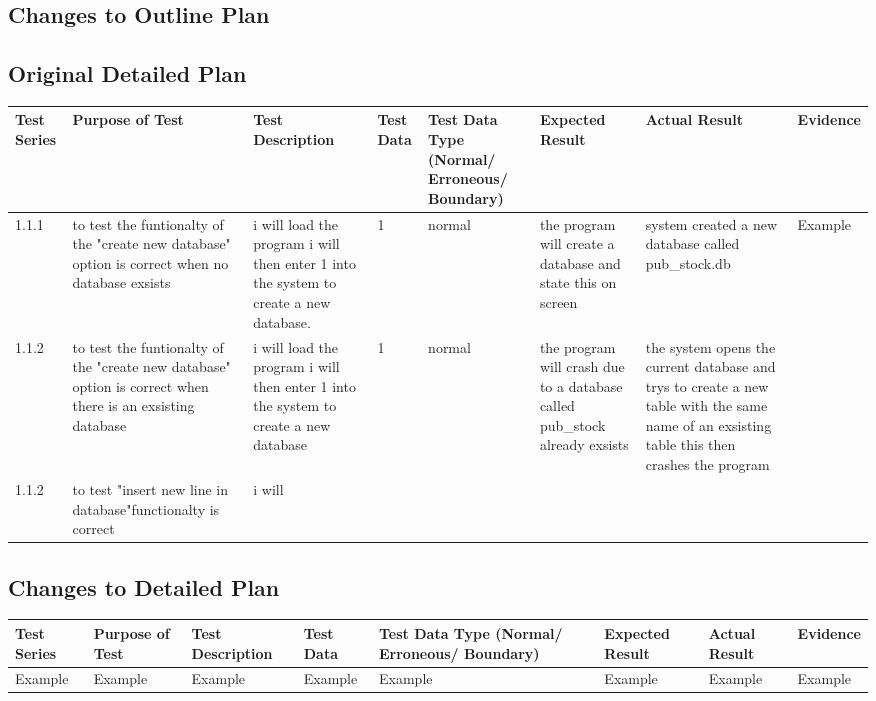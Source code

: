 \begin{landscape}
\subsection{Changes to Outline Plan}

\subsection{Original Detailed Plan}

\begin{center}
    \begin{longtable}{|p{1.5cm}|p{2.5cm}|p{2.5cm}|p{2cm}|p{2cm}|p{2cm}|p{2cm}|p{2cm}|}
        \hline
        \textbf{Test Series} & \textbf{Purpose of Test} & \textbf{Test Description} & \textbf{Test Data} & \textbf{Test Data Type (Normal/ Erroneous/ Boundary)} & \textbf{Expected Result} & \textbf{Actual Result} & \textbf{Evidence}\\ \hline
       1.1.1 & to test the funtionalty of the "create new database" option is correct when no database exsists & i will load the program i will then enter 1 into the system to create a new database. & 1 & normal & the program will create a database and state this on screen &system created a new database called pub_stock.db & Example \\ \hline
1.1.2 & to test the funtionalty of the "create new database" option is correct when there is an exsisting database  &  i will load the program i will then enter 1 into the system to create a new database & 1 & normal &the program will crash due to a database called pub_stock already exsists & the system opens the current database and trys to create a new table with the same name of an exsisting table this then crashes the program & \\ \hline
1.1.2 & to test "insert new line in database"functionalty is correct & i will

    \end{longtable}
\end{center}

\subsection{Changes to Detailed Plan}

\begin{center}
    \begin{longtable}{|p{1.5cm}|p{2.5cm}|p{2.5cm}|p{2cm}|p{2cm}|p{2cm}|p{2cm}|p{2cm}|}
        \hline
        \textbf{Test Series} & \textbf{Purpose of Test} & \textbf{Test Description} & \textbf{Test Data} & \textbf{Test Data Type (Normal/ Erroneous/ Boundary)} & \textbf{Expected Result} & \textbf{Actual Result} & \textbf{Evidence}\\ \hline
        Example & Example & Example & Example & Example & Example & Example & Example \\ \hline
    \end{longtable}
\end{center}


\end{landscape}
